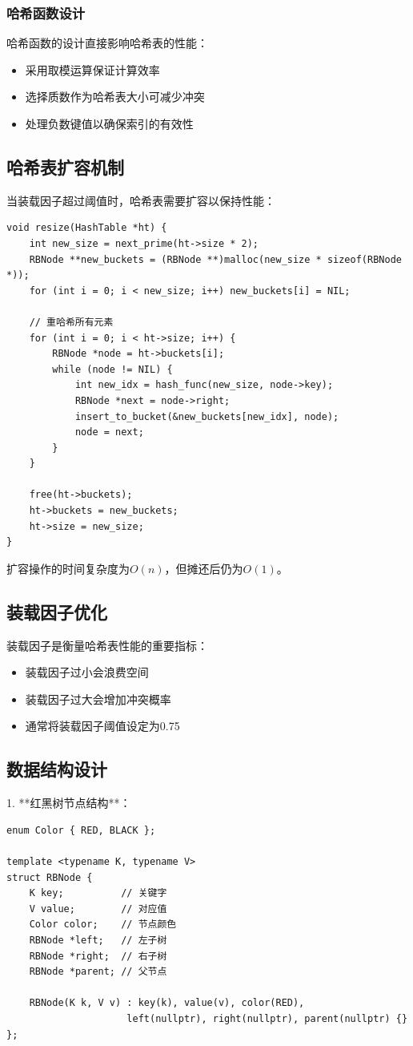 \documentclass[12pt,a4paper]{article}
\begin{document}
\subsubsection{哈希函数设计}
哈希函数的设计直接影响哈希表的性能：
\begin{itemize}
\item 采用取模运算保证计算效率
\item 选择质数作为哈希表大小可减少冲突
\item 处理负数键值以确保索引的有效性
\end{itemize}

\subsection{哈希表扩容机制}
当装载因子超过阈值时，哈希表需要扩容以保持性能：

\begin{lstlisting}[caption=哈希表扩容实现]
void resize(HashTable *ht) {
    int new_size = next_prime(ht->size * 2);
    RBNode **new_buckets = (RBNode **)malloc(new_size * sizeof(RBNode *));
    for (int i = 0; i < new_size; i++) new_buckets[i] = NIL;
    
    // 重哈希所有元素
    for (int i = 0; i < ht->size; i++) {
        RBNode *node = ht->buckets[i];
        while (node != NIL) {
            int new_idx = hash_func(new_size, node->key);
            RBNode *next = node->right;
            insert_to_bucket(&new_buckets[new_idx], node);
            node = next;
        }
    }
    
    free(ht->buckets);
    ht->buckets = new_buckets;
    ht->size = new_size;
}
\end{lstlisting}

扩容操作的时间复杂度为$O(n)$，但摊还后仍为$O(1)$。

\subsection{装载因子优化}
装载因子是衡量哈希表性能的重要指标：
\begin{itemize}
\item 装载因子过小会浪费空间
\item 装载因子过大会增加冲突概率
\item 通常将装载因子阈值设定为0.75
\end{itemize}
\subsection{数据结构设计}
1. **红黑树节点结构**：
\begin{lstlisting}
enum Color { RED, BLACK };

template <typename K, typename V>
struct RBNode {
    K key;          // 关键字
    V value;        // 对应值
    Color color;    // 节点颜色
    RBNode *left;   // 左子树
    RBNode *right;  // 右子树
    RBNode *parent; // 父节点

    RBNode(K k, V v) : key(k), value(v), color(RED),
                     left(nullptr), right(nullptr), parent(nullptr) {}
};
\end{lstlisting}
\end{document}
